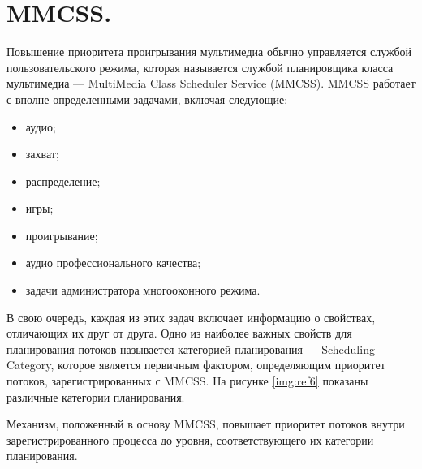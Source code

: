 \begin{figure}[ht!]
\end{figure}

\section{MMCSS.}

Повышение приоритета проигрывания мультимедиа обычно управляется
службой пользовательского режима, которая называется службой планировщика 
класса мультимедиа — MultiMedia Class Scheduler Service (MMCSS).
MMCSS работает с вполне определенными задачами, включая следующие:

\begin{itemize}
    \item аудио;
    \item захват;
    \item распределение;
    \item игры;
    \item проигрывание;
    \item аудио профессионального качества;
    \item задачи администратора многооконного режима.
\end{itemize}

В свою очередь, каждая из этих задач включает информацию о свойствах, отличающих
их друг от друга. Одно из наиболее важных свойств для планирования
потоков называется категорией планирования — Scheduling Category, которое
является первичным фактором, определяющим приоритет потоков, зарегистрированных
с MMCSS. На рисунке \ref{img:ref6} показаны различные категории планирования.

Механизм, положенный в основу MMCSS, повышает приоритет потоков
внутри зарегистрированного процесса до уровня, соответствующего их категории
планирования.

\begin{figure}[ht!]
\end{figure}

